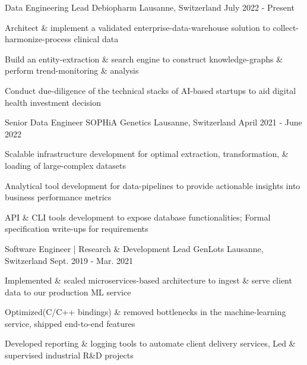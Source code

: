 

\begin{cventries}

\vspace{-0.2cm}
 \cventry
    {Data Engineering Lead} %
    {Debiopharm} %
    {Lausanne, Switzerland} %
    {July 2022 - Present} %
    {
      \begin{cvitems} %
        \item {Architect \& implement a validated enterprise-data-warehouse solution to collect-harmonize-process clinical data}
        \item {Build an entity-extraction \& search engine to construct knowledge-graphs \& perform trend-monitoring \& analysis}
        \item {Conduct due-diligence of the technical stacks of AI-based startups to aid digital health investment decision}
      \end{cvitems}
    }

	
 \cventry
    {Senior Data Engineer} %
    {SOPHiA Genetics} %
    {Lausanne, Switzerland} %
    {April 2021 - June 2022} %
    {
      \begin{cvitems} %
        \item {Scalable infrastructure development for optimal extraction, transformation, \& loading of large-complex datasets}
        \item {Analytical tool development for data-pipelines to provide actionable insights into business performance metrics}
        \item {API \& CLI tools development to expose database functionalities; Formal specification write-ups for requirements}
      \end{cvitems}
    }

  \cventry
    {Software Engineer | Research \& Development Lead} %
    {GenLots} %
    {Lausanne, Switzerland} %
    {Sept. 2019 - Mar. 2021} %
    {
      \begin{cvitems} %
      	\item {Implemented \& scaled microservices-based architecture to ingest \& serve client data to our production ML service}
      	\item {Optimized(C/C++ bindings) \& removed bottlenecks in the machine-learning service, shipped end-to-end features}
        \item {Developed reporting \& logging tools to automate client delivery services, Led \& supervised industrial R\&D projects}
      \end{cvitems}
    } 
   


\end{cventries}

